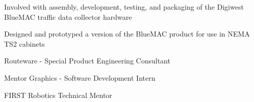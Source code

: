 \documentclass[letterpaper]{deedy-resume} %
\begin{document}
\begin{minipage}[t]{0.66\textwidth}
\vspace{\topsep} %

\begin{tightitemize}
\item Involved with assembly, development, testing, and packaging of the Digiwest BlueMAC traffic data collector hardware

\item Designed and prototyped a version of the BlueMAC product for use in NEMA TS2 cabinets
\end{tightitemize}
\vspace{\topsep} %

\begin{tightitemize}
\item Routeware - Special Product Engineering Consultant
\item Mentor Graphics - Software Development Intern
\item FIRST Robotics Technical Mentor

\end{tightitemize}

\end{minipage} %








\end{document}
